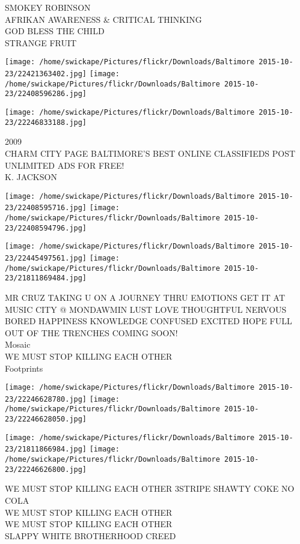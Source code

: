 \documentclass[10pt,letterpaper]{article}
\begin{document}
SMOKEY ROBINSON\\
AFRIKAN AWARENESS \& CRITICAL THINKING\\
GOD BLESS THE CHILD\\
STRANGE FRUIT\\
\pagebreak

\texttt{[image: /home/swickape/Pictures/flickr/Downloads/Baltimore 2015-10-23/22421363402.jpg]}
\texttt{[image: /home/swickape/Pictures/flickr/Downloads/Baltimore 2015-10-23/22408596286.jpg]}

\vspace{0.25in}
\texttt{[image: /home/swickape/Pictures/flickr/Downloads/Baltimore 2015-10-23/22246833188.jpg]}

2009\\
CHARM CITY PAGE BALTIMORE'S BEST ONLINE CLASSIFIEDS POST UNLIMITED ADS FOR FREE!\\
K. JACKSON\\
\pagebreak

\texttt{[image: /home/swickape/Pictures/flickr/Downloads/Baltimore 2015-10-23/22408595716.jpg]}
\texttt{[image: /home/swickape/Pictures/flickr/Downloads/Baltimore 2015-10-23/22408594796.jpg]}

\texttt{[image: /home/swickape/Pictures/flickr/Downloads/Baltimore 2015-10-23/22445497561.jpg]}
\texttt{[image: /home/swickape/Pictures/flickr/Downloads/Baltimore 2015-10-23/21811869484.jpg]}

MR CRUZ TAKING U ON A JOURNEY THRU EMOTIONS GET IT AT MUSIC CITY @ MONDAWMIN LUST LOVE THOUGHTFUL NERVOUS BORED HAPPINESS KNOWLEDGE CONFUSED EXCITED HOPE FULL OUT OF THE TRENCHES COMING SOON!\\
Mosaic\\
WE MUST STOP KILLING EACH OTHER\\
Footprints\\
\pagebreak

\texttt{[image: /home/swickape/Pictures/flickr/Downloads/Baltimore 2015-10-23/22246628780.jpg]}
\texttt{[image: /home/swickape/Pictures/flickr/Downloads/Baltimore 2015-10-23/22246628050.jpg]}

\texttt{[image: /home/swickape/Pictures/flickr/Downloads/Baltimore 2015-10-23/21811866984.jpg]}
\texttt{[image: /home/swickape/Pictures/flickr/Downloads/Baltimore 2015-10-23/22246626800.jpg]}

WE MUST STOP KILLING EACH OTHER 3STRIPE SHAWTY COKE NO COLA\\
WE MUST STOP KILLING EACH OTHER\\
WE MUST STOP KILLING EACH OTHER\\
SLAPPY WHITE BROTHERHOOD CREED\\
\pagebreak
\end{document}
